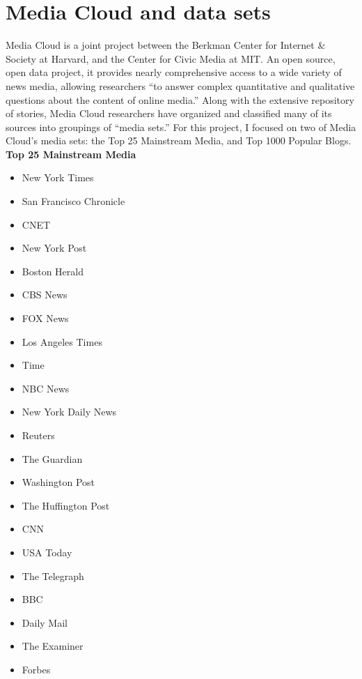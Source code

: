 \chapter{Media Cloud and data sets}

Media Cloud is a joint project between the Berkman Center for Internet \& Society at Harvard, and the Center for Civic Media at MIT. An open source, open data project, it provides nearly comprehensive access to a wide variety of news media, allowing researchers ``to answer complex quantitative and qualitative questions about the content of online media.'' Along with the extensive repository of stories, Media Cloud researchers have organized and classified many of its sources into groupings of ``media sets.'' For this project, I focused on two of Media Cloud's media sets: the Top 25 Mainstream Media, and Top 1000 Popular Blogs.\\

\textbf{Top 25 Mainstream Media}\begin{itemize}
\item New York Times
\item San Francisco Chronicle
\item CNET
\item New York Post
\item Boston Herald
\item CBS News
\item FOX News
\item Los Angeles Times
\item Time
\item NBC News
\item New York Daily News
\item Reuters
\item The Guardian
\item Washington Post
\item The Huffington Post
\item CNN
\item USA Today
\item The Telegraph
\item BBC
\item Daily Mail
\item The Examiner
\item Forbes\end{itemize}

